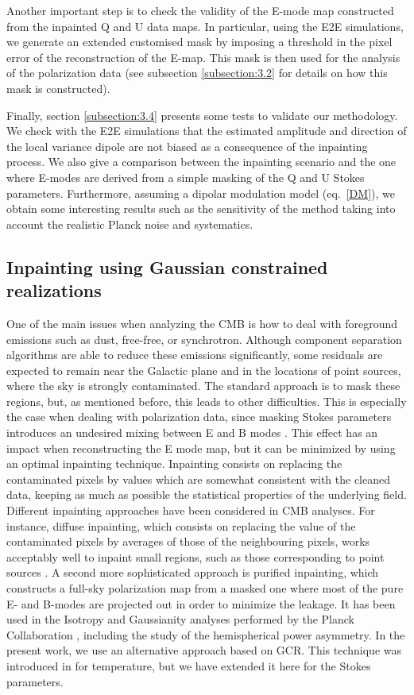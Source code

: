 Another important step is to check the validity of the E-mode map constructed from the inpainted Q and U data maps. In particular, using the E2E simulations, we generate an extended customised mask by imposing a threshold in the pixel error of the reconstruction of the E-map. This mask is then used for the analysis of the polarization data (see subsection \ref{subsection:3.2} for details on how this mask is constructed).

Finally, section \ref{subsection:3.4} presents some tests to validate our methodology.
We check with the E2E simulations that the estimated amplitude and direction of the local variance dipole are not biased as a consequence of the inpainting process. We also give a comparison between the inpainting scenario and the one where E-modes are derived from a simple masking of the Q and U Stokes parameters. Furthermore, assuming a dipolar modulation model (eq.~\ref{DM}), we obtain some interesting results such as 
the sensitivity of the method taking into account the realistic Planck noise and systematics.

\subsection{Inpainting using Gaussian constrained realizations}\label{subsection:3.1}

One of the main issues when analyzing the CMB is how to deal with foreground emissions such as dust, free-free, or synchrotron. Although component separation algorithms are able to reduce these emissions significantly, some residuals are expected to remain near the Galactic plane and in the
locations of point sources, where the sky is strongly contaminated. 
The standard approach is to mask these regions, 
but, as mentioned before, this leads to other  difficulties.
This is especially the case when dealing with polarization data,
since masking Stokes parameters introduces an undesired mixing between E and B modes \cite{Tegmark:2001zv, Lewis:2003an}. This effect has an impact 
when reconstructing the E mode map, but it can be minimized by using an optimal inpainting technique. Inpainting consists on replacing the contaminated pixels by values which are somewhat consistent with the cleaned data, keeping as much as possible the statistical properties of the underlying field.
Different inpainting approaches have been considered in CMB analyses. For instance, 
diffuse inpainting, which consists on replacing the value of the contaminated pixels by averages of those of the neighbouring pixels, works acceptably well to inpaint small regions, such as those 
corresponding to point sources \cite{Planck:2018yye}. A second more sophisticated approach is purified inpainting, which constructs a full-sky polarization map from a masked one where most of the pure E- and B-modes are projected out in order to minimize the leakage. It has been used in the Isotropy and Gaussianity analyses performed by the Planck Collaboration \citep{Planck:2019evm}, including the study of the hemispherical power asymmetry.
In the present work, we use an alternative approach 
based on GCR. This technique was introduced in \cite{Marcos-Caballero:2019jqj} for temperature, but we have extended it here for the Stokes parameters.

